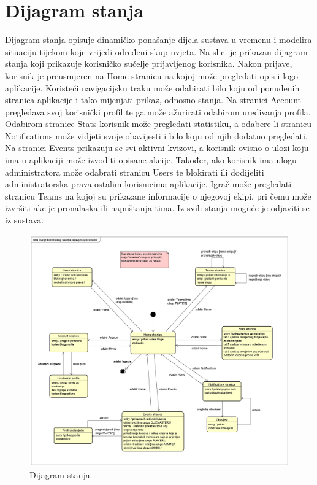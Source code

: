 		\section{Dijagram stanja}
		
		
		Dijagram stanja opisuje dinamičko ponašanje dijela sustava u vremenu i  modelira situaciju tijekom koje vrijedi određeni skup uvjeta. Na slici je prikazan dijagram stanja koji prikazuje korisničko sučelje prijavljenog korisnika. Nakon prijave, korisnik je preusmjeren na Home stranicu na kojoj može pregledati opis i logo aplikacije. Koristeći navigacijsku traku može odabirati bilo koju od ponuđenih stranica aplikacije i tako mijenjati prikaz, odnosno stanja. Na stranici Account pregledava svoj korisnički profil te ga može ažurirati odabirom uređivanja profila. Odabirom stranice Stats korisnik može pregledati statistiku, a odabere li stranicu Notifications može vidjeti svoje obavijesti i bilo koju od njih dodatno pregledati. Na stranici Events prikazuju se svi aktivni kvizovi, a korisnik ovisno o ulozi koju ima u aplikaciji može izvoditi opisane akcije. Također, ako korisnik ima ulogu administratora može odabrati stranicu Users te blokirati ili dodijeliti administratorska prava ostalim korisnicima aplikacije. Igrač može pregledati stranicu Teams na kojoj su prikazane informacije o njegovoj ekipi, pri čemu može izvršiti akcije pronalaska ili napuštanja tima. Iz svih stanja moguće je odjaviti se iz sustava. 
		
		
		\begin{figure}[H]
			\includegraphics[width=\textwidth]{dijagrami/StatemachineDiagram.PNG} 
			\caption{Dijagram stanja}
			\label{fig:StatemachineDiagram}
		\end{figure}
		
